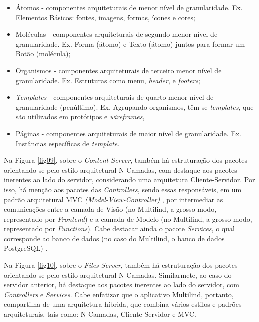\begin{itemize}
	\item Átomos - componentes arquiteturais de menor nível de granularidade. Ex. Elementos Básicos: fontes, imagens, formas, ícones e cores;
	\item Moléculas - componentes arquiteturais de segundo menor nível de granularidade. Ex. Forma (átomo) e Texto (átomo) juntos para formar um Botão (molécula);
	\item Organismos - componentes arquiteturais de terceiro menor nível de granularidade. Ex. Estruturas como menu, \textit{header}, e \textit{footers};
	\item \textit{Templates} - componentes arquiteturais de quarto menor nível de granularidade (penúltimo). Ex. Agrupando organismos, têm-se \textit{templates}, que são utilizados em protótipos e \textit{wireframes}, 
	\item Páginas - componentes arquiteturais de maior nível de granularidade. Ex. Instâncias específicas de \textit{template}.
\end{itemize}

Na Figura \ref{fig09}, sobre o \textit{Content Server}, também há estruturação dos pacotes orientando-se pelo estilo arquitetural N-Camadas, com destaque aos pacotes inerentes ao lado do servidor, considerando uma arquitetura Cliente-Servidor. Por isso, há menção aos pacotes das \textit{Controllers}, sendo essas responsáveis, em um padrão 
arquitetural MVC \textit{(Model-View-Controller)} \cite{designpattern}, por intermediar as comunicações entre a camada de Visão (no Multilind, a grosso modo, representado por \textit{Frontend}) e a camada de Modelo (no Multilind, a grosso modo, representado por \textit{Functions}). Cabe destacar ainda o pacote \textit{Services}, o qual corresponde ao banco 
de dados (no caso do Multilind, o banco de dados PostgreSQL) \cite{larman2004}.

Na Figura \ref{fig10}, sobre o \textit{Files Server}, também há estruturação dos pacotes orientando-se pelo estilo arquitetural N-Camadas. Similarmete, ao caso do servidor anterior, há destaque aos pacotes inerentes ao lado do servidor, com \textit{Controllers} e \textit{Services}. Cabe enfatizar que o aplicativo Multilind, portanto, compartilha de 
uma arquitetura híbrida, que combina vários estilos e padrões arquiteturais, tais como: N-Camadas, Cliente-Servidor e MVC.

